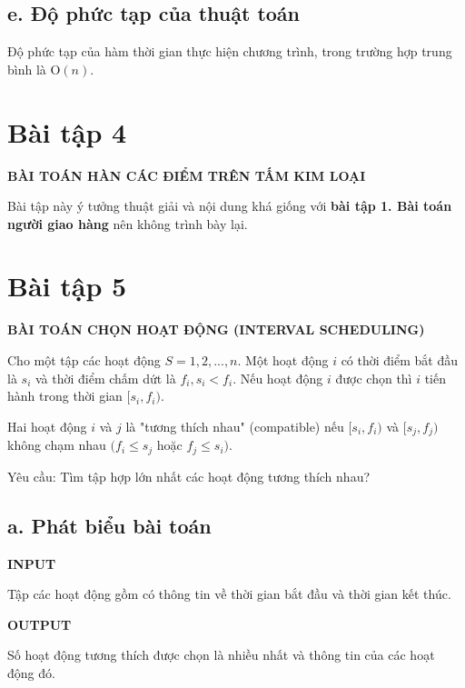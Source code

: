 \documentclass[12pt, a4paper, fleqn]{article}
\begin{document}
	\subsection*{e. Độ phức tạp của thuật toán}
	
	Độ phức tạp của hàm thời gian thực hiện chương trình, trong trường hợp trung bình là O$(n)$.
	
	\clearpage

	\section*{Bài tập 4}
	

	\textbf{BÀI TOÁN HÀN CÁC ĐIỂM TRÊN TẤM KIM LOẠI}

	Bài tập này ý tưởng thuật giải và nội dung khá giống với \textbf{bài tập 1. Bài toán người giao hàng} nên không trình bày lại.

	\clearpage

	\section*{Bài tập 5}
	
	
	\textbf{BÀI TOÁN CHỌN HOẠT ĐỘNG (INTERVAL SCHEDULING)}
	
	Cho một tập các hoạt động $S = {1, 2, ..., n}$. Một hoạt động $i$ có thời điểm bắt đầu là $s_i$ và thời điểm chấm dứt là $f_i, s_i < f_i$. Nếu hoạt động $i$ được chọn thì $i$ tiến hành trong thời gian $[s_i, f_i)$.
	
	Hai hoạt động $i$ và $j$ là "tương thích nhau" (compatible) nếu $[s_i, f_i)$ và $[s_j, f_j)$ không chạm nhau $(f_i \leq s_j$ hoặc $f_j \leq s_i)$.
	
	Yêu cầu: Tìm tập hợp lớn nhất các hoạt động tương thích nhau?
	
	\subsection*{a. Phát biểu bài toán}
	
	\textbf{INPUT}
	
	Tập các hoạt động gồm có thông tin về thời gian bắt đầu và thời gian kết thúc.
	
	\textbf{OUTPUT}
	
	Số hoạt động tương thích được chọn là nhiều nhất và thông tin của các hoạt động đó.
	
\end{document}
